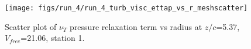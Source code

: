 \begin{figure}[H]
\centering
\texttt{[image: figs/run\_4/run\_4\_turb\_visc\_ettap\_vs\_r\_meshscatter]}
\caption{Scatter plot of $\nu_T$ pressure relaxation term vs radius at $z/c$=5.37, $V_{free}$=21.06, station 1.}
\label{fig:run_4_turb_visc_ettap_vs_r_meshscatter}
\end{figure}


